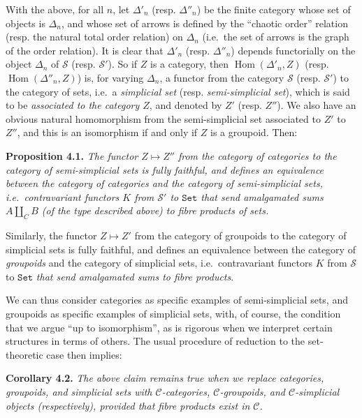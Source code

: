 \documentclass{article}
\newenvironment{itenv}[1]
  {\phantomsection\par\smallskip\noindent\textbf{#1.}\itshape}
  {\par\smallskip}
\newcommand{\oldpage}[1]{\marginpar{\footnotesize$\Big\vert$ \textit{p.~#1}}}
\theoremstyle{definition}
\theoremstyle{definition}
\theoremstyle{definition}
\theoremstyle{definition}
\theoremstyle{remark}
\begin{document}
With the above, for all \(n\), let \(\Delta'_n\) (resp. \(\Delta''_n\)) be the finite category whose set of objects is \(\Delta_n\), and whose set of arrows is defined by the ``chaotic order'' relation (resp. the natural total order relation) on \(\Delta_n\) (i.e.~the set of arrows is the graph of the order relation).
It is clear that \(\Delta'_n\) (resp. \(\Delta''_n\)) depends functorially on the object \(\Delta_n\) of \({\mathcal{S}}\) (resp. \({\mathcal{S}}'\)).
So if \(Z\) is a category, then \(\operatorname{Hom}(\Delta'_n,Z)\) (resp. \(\operatorname{Hom}(\Delta''_n,Z)\)) is, for varying \(\Delta_n\), a functor from the category \({\mathcal{S}}\) (resp. \({\mathcal{S}}'\)) to the category of sets, i.e.~a \emph{simplicial set} (resp. \emph{semi-simplicial set}), which is said to be \emph{associated to the category \(Z\)}, and denoted by \(Z'\) (resp. \(Z''\)).
We also have an obvious natural homomorphism from the semi-simplicial set associated to \(Z'\) to \(Z''\), and this is an isomorphism if and only if \(Z\) is a groupoid.
Then:

\leavevmode{}%
\begin{itenv}{Proposition 4.1}
The functor \(Z\mapsto Z''\) from the category of categories to the category of semi-simplicial sets is fully faithful, and defines an equivalence between the category of \emph{categories} and the category of semi-simplicial sets, i.e.~contravariant functors \(K\) from \({\mathcal{S}}'\) to \(\mathtt{Set}\) \emph{that send amalgamated sums \(A\coprod_C B\) (of the type described above) to fibre products of sets}.

\oldpage{212-11}Similarly, the functor \(Z\mapsto Z'\) from the category of groupoids to the category of simplicial sets is fully faithful, and defines an equivalence between the category of \emph{groupoids} and the category of simplicial sets, i.e.~contravariant functors \(K\) from \({\mathcal{S}}\) to \(\mathtt{Set}\) \emph{that send amalgamated sums to fibre products}.

\end{itenv}

We can thus consider categories as specific examples of semi-simplicial sets, and groupoids as specific examples of simplicial sets, with, of course, the condition that we argue ``up to isomorphism'', as is rigorous when we interpret certain structures in terms of others.
The usual procedure of reduction to the set-theoretic case then implies:

\leavevmode{}%
\begin{itenv}{Corollary 4.2}
The above claim remains true when we replace categories, groupoids, and simplicial sets with \({\mathcal{C}}\)-categories, \({\mathcal{C}}\)-groupoids, and \({\mathcal{C}}\)-simplicial objects (respectively), \emph{provided that} fibre products exist in \({\mathcal{C}}\).

\end{itenv}
\end{document}
